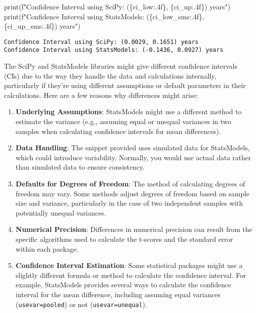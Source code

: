 \documentclass[
  letterpaper,
  DIV=11,
  numbers=noendperiod]{scrartcl}
\newenvironment{Shaded}{\begin{snugshade}}{\end{snugshade}}
\newcommand{\BuiltInTok}[1]{\textcolor[rgb]{0.00,0.23,0.31}{#1}}
\newcommand{\NormalTok}[1]{\textcolor[rgb]{0.00,0.23,0.31}{#1}}
\newcommand{\SpecialCharTok}[1]{\textcolor[rgb]{0.37,0.37,0.37}{#1}}
\newcommand{\SpecialStringTok}[1]{\textcolor[rgb]{0.13,0.47,0.30}{#1}}
\begin{document}
\begin{Shaded}
\begin{Highlighting}[]
\BuiltInTok{print}\NormalTok{(}\SpecialStringTok{f"Confidence Interval using SciPy: (}\SpecialCharTok{\{}\NormalTok{ci\_low}\SpecialCharTok{:.4f\}}\SpecialStringTok{, }\SpecialCharTok{\{}\NormalTok{ci\_up}\SpecialCharTok{:.4f\}}\SpecialStringTok{) years"}\NormalTok{)}
\BuiltInTok{print}\NormalTok{(}\SpecialStringTok{f"Confidence Interval using StatsModels: (}\SpecialCharTok{\{}\NormalTok{ci\_low\_sms}\SpecialCharTok{:.4f\}}\SpecialStringTok{, }\SpecialCharTok{\{}\NormalTok{ci\_up\_sms}\SpecialCharTok{:.4f\}}\SpecialStringTok{) years"}\NormalTok{)}
\end{Highlighting}
\end{Shaded}

\begin{verbatim}
Confidence Interval using SciPy: (0.0029, 0.1651) years
Confidence Interval using StatsModels: (-0.1436, 0.0927) years
\end{verbatim}

The SciPy and StatsModels libraries might give different confidence
intervals (CIs) due to the way they handle the data and calculations
internally, particularly if they're using different assumptions or
default parameters in their calculations. Here are a few reasons why
differences might arise:

\begin{enumerate}
\def\labelenumi{\arabic{enumi}.}
\item
  \textbf{Underlying Assumptions}: StatsModels might use a different
  method to estimate the variance (e.g., assuming equal or unequal
  variances in two samples when calculating confidence intervals for
  mean differences).
\item
  \textbf{Data Handling}: The snippet provided uses simulated data for
  StatsModels, which could introduce variability. Normally, you would
  use actual data rather than simulated data to ensure consistency.
\item
  \textbf{Defaults for Degrees of Freedom}: The method of calculating
  degrees of freedom may vary. Some methods adjust degrees of freedom
  based on sample size and variance, particularly in the case of two
  independent samples with potentially unequal variances.
\item
  \textbf{Numerical Precision}: Differences in numerical precision can
  result from the specific algorithms used to calculate the t-scores and
  the standard error within each package.
\item
  \textbf{Confidence Interval Estimation}: Some statistical packages
  might use a slightly different formula or method to calculate the
  confidence interval. For example, StatsModels provides several ways to
  calculate the confidence interval for the mean difference, including
  assuming equal variances
  (\texttt{usevar=\textquotesingle{}pooled\textquotesingle{}}) or not
  (\texttt{usevar=\textquotesingle{}unequal\textquotesingle{}}).
\end{enumerate}
\end{document}
